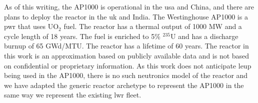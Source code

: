 As of this writing, the AP1000 is operational in the \gls{usa} and China, and there are plans to deploy the reactor in the \gls{uk} and India. The Westinghouse AP1000 is a \gls{pwr} that uses UO$_2$ fuel. The reactor has a thermal output of 1000 MW and a cycle length of 18 years. The fuel is enriched to 5\% $^{235}$U and has a discharge burnup of 65 GWd/MTU. The reactor has a lifetime of 60 years. The reactor in this work is an approximation based on publicly available data and is not based on confidential or proprietary information. As this work does not anticipate \gls{leup} being used in the AP1000, there is no such neutronics model of the reactor and we have adapted the generic \cycamore reactor archetype to represent the AP1000 in the same way we represent the existing \gls{lwr} fleet.
